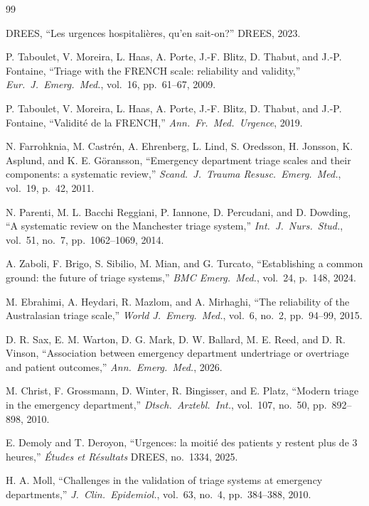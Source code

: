 \documentclass[conference]{IEEEtran}
\begin{document}
\begin{thebibliography}{99}

DREES, ``Les urgences hospitali\`eres, qu'en sait-on?'' DREES, 2023.

P. Taboulet, V. Moreira, L. Haas, A. Porte, J.-F. Blitz, D. Thabut, and J.-P. Fontaine, ``Triage with the FRENCH scale: reliability and validity,'' \emph{Eur.\ J.\ Emerg.\ Med.}, vol.~16, pp.~61--67, 2009.

P. Taboulet, V. Moreira, L. Haas, A. Porte, J.-F. Blitz, D. Thabut, and J.-P. Fontaine, ``Validit\'e de la FRENCH,'' \emph{Ann.\ Fr.\ Med.\ Urgence}, 2019.

N. Farrohknia, M. Castr\'en, A. Ehrenberg, L. Lind, S. Oredsson, H. Jonsson, K. Asplund, and K. E. G\"oransson, ``Emergency department triage scales and their components: a systematic review,'' \emph{Scand.\ J.\ Trauma Resusc.\ Emerg.\ Med.}, vol.~19, p.~42, 2011.

N. Parenti, M. L. Bacchi Reggiani, P. Iannone, D. Percudani, and D. Dowding, ``A systematic review on the Manchester triage system,'' \emph{Int.\ J.\ Nurs.\ Stud.}, vol.~51, no.~7, pp.~1062--1069, 2014.

A. Zaboli, F. Brigo, S. Sibilio, M. Mian, and G. Turcato, ``Establishing a common ground: the future of triage systems,'' \emph{BMC Emerg.\ Med.}, vol.~24, p.~148, 2024.

M. Ebrahimi, A. Heydari, R. Mazlom, and A. Mirhaghi, ``The reliability of the Australasian triage scale,'' \emph{World J.\ Emerg.\ Med.}, vol.~6, no.~2, pp.~94--99, 2015.

D. R. Sax, E. M. Warton, D. G. Mark, D. W. Ballard, M. E. Reed, and D. R. Vinson, ``Association between emergency department undertriage or overtriage and patient outcomes,'' \emph{Ann.\ Emerg.\ Med.}, 2026.

M. Christ, F. Grossmann, D. Winter, R. Bingisser, and E. Platz, ``Modern triage in the emergency department,'' \emph{Dtsch.\ Arztebl.\ Int.}, vol.~107, no.~50, pp.~892--898, 2010.

E. Demoly and T. Deroyon, ``Urgences: la moiti\'e des patients y restent plus de 3 heures,'' \emph{\'Etudes et R\'esultats} DREES, no.~1334, 2025.

H. A. Moll, ``Challenges in the validation of triage systems at emergency departments,'' \emph{J.\ Clin.\ Epidemiol.}, vol.~63, no.~4, pp.~384--388, 2010.


\end{thebibliography}
\end{document}
